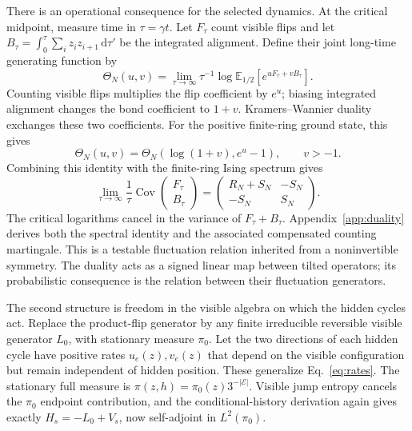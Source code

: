 \documentclass[aps,pre,reprint,amsmath,amssymb,longbibliography,floatfix]{revtex4-2}
\newcommand{\E}{\mathbb E}
\newcommand{\dd}{\,\mathrm d}
\begin{document}
There is an operational consequence for the selected dynamics. At the
critical midpoint, measure time in $\tau=\gamma t$. Let $F_\tau$ count
visible flips and let $B_\tau=\int_0^\tau\sum_i z_i z_{i+1}\dd\tau'$
be the integrated alignment. Define their joint long-time generating
function by
\begin{equation}
 \Theta_N(u,v)=\lim_{\tau\to\infty}\tau^{-1}
 \log\E_{1/2}\left[e^{uF_\tau+vB_\tau}\right].
 \label{eq:Theta}
\end{equation}
Counting visible flips multiplies the flip coefficient by $e^u$;
biasing integrated alignment changes the bond coefficient to $1+v$.
Kramers--Wannier duality exchanges these two coefficients. For the
positive finite-ring ground state, this gives
\begin{equation}
 \Theta_N(u,v)=\Theta_N(\log(1+v),e^u-1),\qquad v>-1.
 \label{eq:stochasticKW}
\end{equation}
Combining this identity with the finite-ring Ising spectrum gives
\begin{equation}
 \lim_{\tau\to\infty}\frac1\tau
 \operatorname{Cov}\begin{pmatrix}F_\tau\\B_\tau\end{pmatrix}
 =\begin{pmatrix}R_N+S_N&-S_N\\-S_N&S_N\end{pmatrix}.
 \label{eq:KWcov}
\end{equation}
The critical logarithms cancel in the variance of $F_\tau+B_\tau$.
Appendix~\ref{app:duality} derives both the spectral identity and the
associated compensated counting martingale. This is a testable
fluctuation relation inherited from a noninvertible symmetry. The duality acts as a signed linear map between tilted operators;
its probabilistic consequence is the relation between their fluctuation
generators.

The second structure is freedom in the visible algebra on which the
hidden cycles act. Replace the product-flip generator by any finite
irreducible reversible visible generator $L_0$, with stationary measure
$\pi_0$. Let the two directions of each hidden cycle have positive
rates $u_e(z),v_e(z)$ that depend on the visible configuration but
remain independent of hidden position. These generalize Eq.~\eqref{eq:rates}. The stationary full
measure is $\pi(z,h)=\pi_0(z)3^{-|\mathcal E|}$. Visible jump entropy cancels the
$\pi_0$ endpoint contribution, and the conditional-history derivation
again gives exactly $H_s=-L_0+V_s$, now self-adjoint in $L^2(\pi_0)$.
\end{document}
